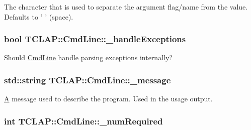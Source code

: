 The character that is used to separate the argument flag/name from the value. Defaults to ' ' (space). \hypertarget{class_t_c_l_a_p_1_1_cmd_line_a3609d0c13886053b367d1df80efbe67b}{
\subsubsection[{\+\_\+handle\+Exceptions}]{\setlength{\rightskip}{0pt plus 5cm}bool T\+C\+L\+A\+P\+::\+Cmd\+Line\+::\+\_\+handle\+Exceptions\hspace{0.3cm}{\ttfamily [protected]}}}\label{class_t_c_l_a_p_1_1_cmd_line_a3609d0c13886053b367d1df80efbe67b}
Should \hyperlink{class_t_c_l_a_p_1_1_cmd_line}{Cmd\+Line} handle parsing exceptions internally? \hypertarget{class_t_c_l_a_p_1_1_cmd_line_a3ccd2ae40f6eb97aebca3de9a02f10cf}{
\subsubsection[{\+\_\+message}]{\setlength{\rightskip}{0pt plus 5cm}std\+::string T\+C\+L\+A\+P\+::\+Cmd\+Line\+::\+\_\+message\hspace{0.3cm}{\ttfamily [protected]}}}\label{class_t_c_l_a_p_1_1_cmd_line_a3ccd2ae40f6eb97aebca3de9a02f10cf}
\hyperlink{class_a}{A} message used to describe the program. Used in the usage output. \hypertarget{class_t_c_l_a_p_1_1_cmd_line_a2285207b528d5fad18c82a2ee8155f37}{
\subsubsection[{\+\_\+num\+Required}]{\setlength{\rightskip}{0pt plus 5cm}int T\+C\+L\+A\+P\+::\+Cmd\+Line\+::\+\_\+num\+Required\hspace{0.3cm}{\ttfamily [protected]}}}\label{class_t_c_l_a_p_1_1_cmd_line_a2285207b528d5fad18c82a2ee8155f37}
